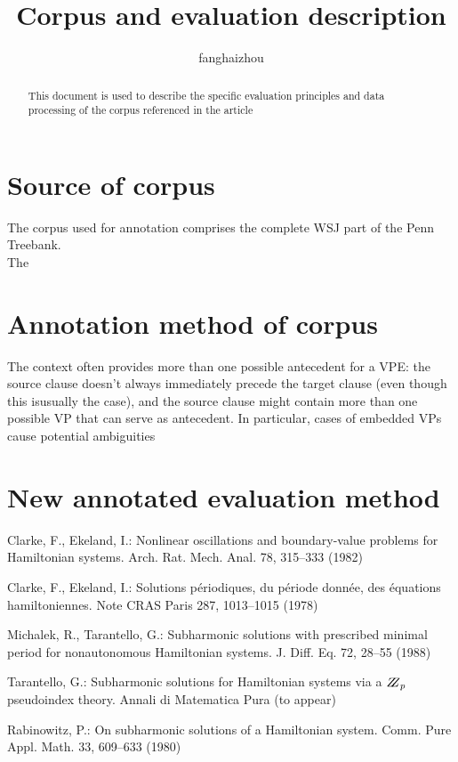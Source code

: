 \documentclass{llncs}
\begin{document}
\title{Corpus and evaluation description}
%
%
\author{fanghaizhou}
%
%
\tocauthor{}
%

\maketitle              %

\begin{abstract}
This document is used to describe the specific evaluation principles and data processing of the corpus referenced in the article
\end{abstract}
%
\section{Source of corpus}
The corpus used for annotation comprises the complete WSJ part of the Penn Treebank.
\\
The
\section{Annotation method of corpus}
The context often provides more than one possible antecedent for a VPE: the source clause  doesn’t  always  immediately  precede  the  target  clause  (even  though  this  isusually the case), and the source clause might contain more than one possible VP that can serve as antecedent. In particular, cases of embedded VPs cause potential ambiguities
\section{New annotated evaluation method}
%
\begin{thebibliography}{5}
%
Clarke, F., Ekeland, I.:
Nonlinear oscillations and
boundary-value problems for Hamiltonian systems.
Arch. Rat. Mech. Anal. 78, 315--333 (1982)

Clarke, F., Ekeland, I.:
Solutions p\'{e}riodiques, du
p\'{e}riode donn\'{e}e, des \'{e}quations hamiltoniennes.
Note CRAS Paris 287, 1013--1015 (1978)

Michalek, R., Tarantello, G.:
Subharmonic solutions with prescribed minimal
period for nonautonomous Hamiltonian systems.
J. Diff. Eq. 72, 28--55 (1988)

Tarantello, G.:
Subharmonic solutions for Hamiltonian
systems via a $\bbbz_{p}$ pseudoindex theory.
Annali di Matematica Pura (to appear)

Rabinowitz, P.:
On subharmonic solutions of a Hamiltonian system.
Comm. Pure Appl. Math. 33, 609--633 (1980)

\end{thebibliography}
\end{document}
